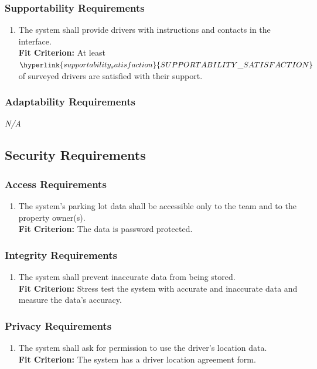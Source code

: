 \documentclass[12pt,letterpaper]{article}
\begin{document}
\subsubsection{Supportability Requirements}
\begin{enumerate}[resume*] 
    \item The system shall provide drivers with instructions and contacts in the
    interface.\\
    \textbf{Fit Criterion:} At least
    $\hyperlink{supportability_satisfaction}{SUPPORTABILITY\_SATISFACTION}$ of
    surveyed drivers are satisfied with their support.
\end{enumerate}

\subsubsection{Adaptability Requirements}
\noindent \emph{N/A}

\subsection{Security Requirements}
\subsubsection{Access Requirements}
\begin{enumerate}[{SR}1.] 
    \item The system's parking lot data shall be accessible only to the team and
    to the property owner(s).\label{pocnf5} \\
    \textbf{Fit Criterion:} The data is password protected.
\end{enumerate}

\subsubsection{Integrity Requirements}
\begin{enumerate}[resume*] 
    \item The system shall prevent inaccurate data from being stored.\\
    \textbf{Fit Criterion:} Stress test the system with accurate and inaccurate
    data and measure the data's accuracy.
\end{enumerate}

\subsubsection{Privacy Requirements}
\begin{enumerate}[resume*] 
    \item The system shall ask for permission to use the driver's location
    data.\\
    \textbf{Fit Criterion:} The system has a driver location agreement form.
\end{enumerate}
\end{document}
